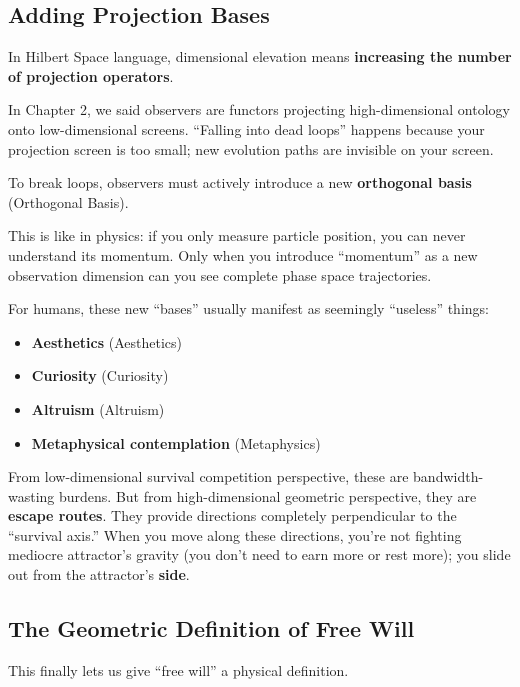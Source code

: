 \documentclass[11pt,a4paper,twoside]{book}
\begin{document}
\subsection{Adding Projection Bases}

In Hilbert Space language, dimensional elevation means \textbf{increasing the number of projection operators}.

In Chapter 2, we said observers are functors projecting high-dimensional ontology onto low-dimensional screens. ``Falling into dead loops'' happens because your projection screen is too small; new evolution paths are invisible on your screen.

To break loops, observers must actively introduce a new \textbf{orthogonal basis} (Orthogonal Basis).

This is like in physics: if you only measure particle position, you can never understand its momentum. Only when you introduce ``momentum'' as a new observation dimension can you see complete phase space trajectories.

For humans, these new ``bases'' usually manifest as seemingly ``useless'' things:

\begin{itemize}
\item \textbf{Aesthetics} (Aesthetics)

\item \textbf{Curiosity} (Curiosity)

\item \textbf{Altruism} (Altruism)

\item \textbf{Metaphysical contemplation} (Metaphysics)
\end{itemize}

From low-dimensional survival competition perspective, these are bandwidth-wasting burdens. But from high-dimensional geometric perspective, they are \textbf{escape routes}. They provide directions completely perpendicular to the ``survival axis.'' When you move along these directions, you're not fighting mediocre attractor's gravity (you don't need to earn more or rest more); you slide out from the attractor's \textbf{side}.

\subsection{The Geometric Definition of Free Will}

This finally lets us give ``free will'' a physical definition.
\end{document}
